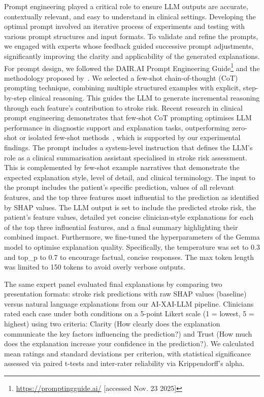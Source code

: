 \medskip
Prompt engineering played a critical role to ensure LLM outputs are accurate, contextually relevant, and easy to understand in clinical settings. Developing the optimal prompt involved an iterative process of experiments and testing with various prompt structures and input formats. To validate and refine the prompts, we engaged with experts whose feedback guided successive prompt adjustments, significantly improving the clarity and applicability of the generated explanations. For prompt design, we followed the DAIR.AI Prompt Engineering Guide\footnote{\url{https://promptingguide.ai/} [accessed Nov. 23 2025]} and the methodology proposed by~\cite{zytek2024llms}. We selected a few-shot chain-of-thought (CoT) prompting technique, combining multiple structured examples with explicit, step-by-step clinical reasoning. This guides the LLM to generate incremental reasoning through each feature's contribution to stroke risk. Recent research in clinical prompt engineering demonstrates that few-shot CoT prompting optimises LLM performance in diagnostic support and explanation tasks, outperforming zero-shot or isolated few-shot methods~\cite{liu2025prompt}, which is supported by our experimental findings. The prompt includes a system-level instruction that defines the LLM's role as a clinical summarisation assistant specialised in stroke risk assessment. This is complemented by few-shot example narratives that demonstrate the expected explanation style, level of detail, and clinical terminology. The input to the prompt includes the patient's specific prediction, values of all relevant features, and the top three features most influential to the prediction as identified by SHAP values. The LLM output is set to include the predicted stroke risk, the patient's feature values, detailed yet concise clinician-style explanations for each of the top three influential features, and a final summary highlighting their combined impact. Furthermore, we fine-tuned the hyperparameters of the Gemma model to optimise explanation quality. Specifically, the temperature was set to 0.3 and top\_p  to 0.7 to encourage factual, concise responses. The max token length was limited to 150 tokens to avoid overly verbose outputs. 

\medskip
The same expert panel evaluated final explanations by comparing two presentation formats: stroke risk predictions with raw SHAP values (baseline) versus natural language explanations from our AI-XAI-LLM pipeline. Clinicians rated each case under both conditions on a 5-point Likert scale (1 = lowest, 5 = highest) using two criteria: Clarity (How clearly does the explanation communicate the key factors influencing the prediction?) and Trust (How much does the explanation increase your confidence in the prediction?). We calculated mean ratings and standard deviations per criterion, with statistical significance assessed via paired t-tests and inter-rater reliability via Krippendorff's alpha.

